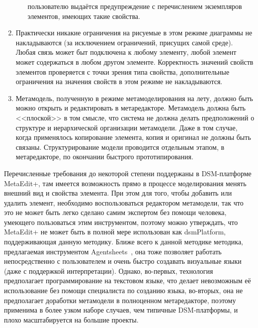 \begin{enumerate}
\begin{enumerate}
			пользователю выдаётся предупреждение с перечислением экземпляров элементов, имеющих 
			такие свойства.
		\end{enumerate}
	\item Практически никакие ограничения на рисуемые в этом режиме диаграммы не накладываются 
		(за исключением ограничений, присущих самой среде). Любая связь может быт подключена 
		к любому элементу, любой элемент может содержаться в любом другом элементе. Корректность 
		значений свойств элементов проверяется с точки зрения типа свойства, дополнительные 
		ограничения на значения свойств в этом режиме не накладываются.
	\item Метамодель, полученную в режиме метамоделирования на лету, должно быть можно 
		открыть и редактировать в метаредакторе. Метамодель должна быть <<плоской>> в том 
		смысле, что система не должна делать предположений о структуре и иерархической 
		организации метамодели. Даже в том случае, когда применялось копирование элемента, 
		копия и оригинал не должны быть связаны. Структурирование модели проводится отдельным 
		этапом, в метаредакторе, по окончании быстрого прототипирования.
\end{enumerate}

Перечисленные требования до некоторой степени поддержаны в DSM-платформе MetaEdit+,
там имеется возможность прямо в процессе моделирования менять внешний вид и свойства элемента. 
При этом для того, чтобы добавить или удалить элемент, необходимо воспользоваться редактором метамодели, 
так что это не может быть легко сделано самим экспертом без помощи человека, умеющего пользоваться этим 
инструментом, поэтому можно утверждать, что MetaEdit+ не может быть в полной мере использован как 
\ac{dsmPlatform}, поддерживающая данную методику. Ближе всего к данной методике 
методика, предлагаемая инструментом Agentsheets~\cite{repenning1995agentsheets}, 
она тоже позволяет работать непосредственно с пользователем и очень быстро создавать 
визуальные языки (даже с поддержкой интерпретации). Однако, во-первых, технология 
предполагает программирование на текстовом языке, что делает невозможным её использование 
без помощи специалиста по созданию языка, во-вторых, она не предполагает доработки метамодели 
в полноценном метаредакторе, поэтому применима в более узком наборе случаев, чем типичные 
DSM-платформы, и плохо масштабируется на большие проекты.

